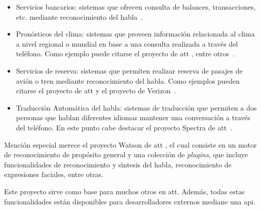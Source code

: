 \begin{itemize}
	\item Servicios bancarios: sistemas que ofrecen consulta de balances, transacciones, etc. mediante
	reconocimiento del \mbox{habla \cite{PreeEnhancing1999}}.

	\item Pron\'osticos del clima: sistemas que proveen informaci\'on relacionada al clima a nivel regional o mundial
	en base a una consulta realizada a trav\'es del tel\'efono. Como ejemplo puede citarse el proyecto 
	de \gls{att} \cite{ZueJupiter2000}, entre \mbox{otros \cite{ZibertBiliengual2003}}.

	\item Servicios de reserva: sistemas que permiten realizar reserva de pasajes de avi\'on o tren mediante
	reconocimiento del habla. Como ejemplos pueden citarse el proyecto  de \gls{att} \cite{Seneff2000Dialogue} 
    y el proyecto  de \mbox{Verizon \cite{StallardEvaluation2001}}.

	\item Traducci\'on Autom\'atica del habla: sistemas de traducci\'on que permiten a dos personas que hablan
	diferentes idiomas mantener una conversaci\'on a trav\'es del tel\'efono. En este punto cabe destacar el
	proyecto Spectra de \mbox{\gls{att} \cite{Rangarajan2012}}.
\end{itemize}

Menci\'on especial merece el proyecto Watson de \gls{att} \cite{AttWatson}, el cual consiste en un motor de reconocimiento de 
prop\'osito general y una colecci\'on de \emph{plugins}, que incluye funcionalidades de reconocimiento y s{\'\i}ntesis
del habla, reconocimiento de expresiones faciales, entre otras. 

Este proyecto sirve como base para muchos otros en \gls{att}. Adem\'as, todas estas funcionalidades est\'an
disponibles para desarrolladores externos mediane una \gls{api}. 
